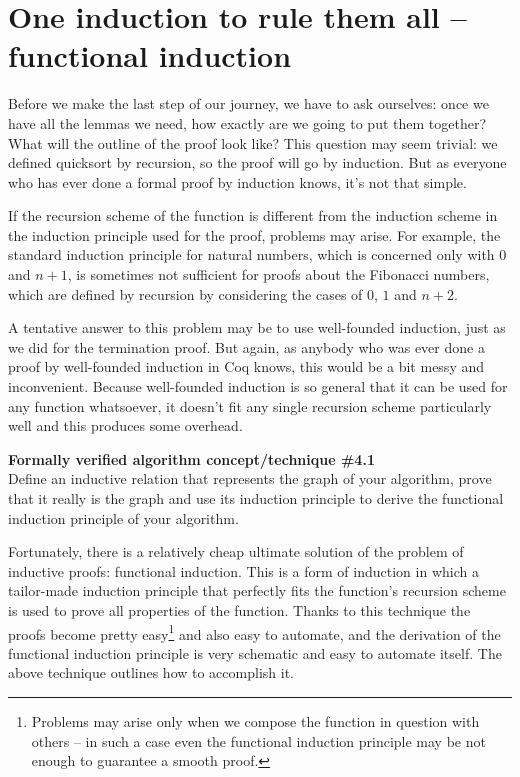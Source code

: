 \documentclass[declaration,mgr,english,shortabstract]{iithesis}
\begin{document}
\section{One induction to rule them all -- functional induction}

Before we make the last step of our journey, we have to ask ourselves: once we have all the lemmas we need, how exactly are we going to put them together? What will the outline of the proof look like? This question may seem trivial: we defined quicksort by recursion, so the proof will go by induction. But as everyone who has ever done a formal proof by induction knows, it's not that simple.

If the recursion scheme of the function is different from the induction scheme in the induction principle used for the proof, problems may arise. For example, the standard induction principle for natural numbers, which is concerned only with $0$ and $n + 1$, is sometimes not sufficient for proofs about the Fibonacci numbers, which are defined by recursion by considering the cases of $0$, $1$ and $n + 2$.

A tentative answer to this problem may be to use well-founded induction, just as we did for the termination proof. But again, as anybody who was ever done a proof by well-founded induction in Coq knows, this would be a bit messy and inconvenient. Because well-founded induction is so general that it can be used for any function whatsoever, it doesn't fit any single recursion scheme particularly well and this produces some overhead.

\begin{center}
    \textbf{Formally verified algorithm concept/technique \#4.1} \\
    Define an inductive relation that represents the graph of your algorithm, prove that it really is the graph and use its induction principle to derive the functional induction principle of your algorithm.
\end{center}

Fortunately, there is a relatively cheap ultimate solution of the problem of inductive proofs: functional induction. This is a form of induction in which a tailor-made induction principle that perfectly fits the function's recursion scheme is used to prove all properties of the function. Thanks to this technique the proofs become pretty easy\footnote{Problems may arise only when we compose the function in question with others -- in such a case even the functional induction principle may be not enough to guarantee a smooth proof.} and also easy to automate, and the derivation of the functional induction principle is very schematic and easy to automate itself. The above technique outlines how to accomplish it.
\end{document}
